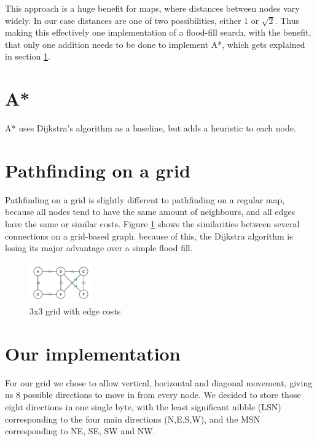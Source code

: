 This approach is a huge benefit for maps,
where distances between nodes vary widely.
In our case distances are one of two possibilities, either $1$ or $ \sqrt{2} $.
Thus making this effectively one implementation of a flood-fill search,
with the benefit, that only one addition needs to be done to implement A*,
which gets explained in section \ref{sec:astar}.

\section{A*}\label{sec:astar}
A* uses Dijkstra's algorithm as a baseline,
but adds a heuristic to each node.


\section{Pathfinding on a grid}
Pathfinding on a grid is slightly different to pathfinding on a regular map,
because all nodes tend to have the same amount of neighbours,
and all edges have the same or similar costs.
Figure \ref{fig:graph_cost} shows the similarities between several connections on a grid-based graph.
because of this, the Dijkstra algorithm is losing its major advantage over a simple flood fill.
\begin{figure}[htp]
	\centering
	\includegraphics[width=0.24\textwidth]{figures/path/graph_values}
	\caption{3x3 grid with edge costs}
	\label{fig:graph_cost}
\end{figure}


\section{Our implementation}
For our grid we chose to allow vertical, horizontal and diagonal movement,
giving us 8 possible directions to move in from every node.
We decided to store those eight directions in one single byte,
with the least significant nibble (LSN) corresponding to the four main directions (N,E,S,W),
and the MSN corresponding to NE, SE, SW and NW.

